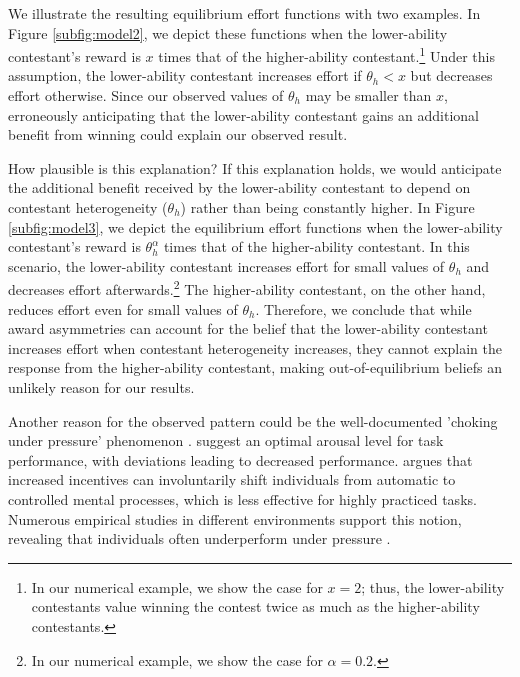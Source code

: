 \documentclass[11pt,a4paper]{article}
\begin{document}
We illustrate the resulting equilibrium effort functions with two examples. In Figure \ref{subfig:model2}, we depict these functions when the lower-ability contestant's reward is $x$ times that of the higher-ability contestant.\footnote{In our numerical example, we show the case for $x = 2$; thus, the lower-ability contestants value winning the contest twice as much as the higher-ability contestants.} Under this assumption, the lower-ability contestant increases effort if $\theta_h < x$ but decreases effort otherwise. Since our observed values of $\theta_h$ may be smaller than $x$, erroneously anticipating that the lower-ability contestant gains an additional benefit from winning could explain our observed result. \par

How plausible is this explanation? If this explanation holds, we would anticipate the additional benefit received by the lower-ability contestant to depend on contestant heterogeneity ($\theta_h$) rather than being constantly higher. In Figure \ref{subfig:model3}, we depict the equilibrium effort functions when the lower-ability contestant's reward is $\theta_h^\alpha$ times that of the higher-ability contestant. In this scenario, the lower-ability contestant increases effort for small values of $\theta_h$ and decreases effort afterwards.\footnote{In our numerical example, we show the case for $\alpha = 0.2$.} The higher-ability contestant, on the other hand, reduces effort even for small values of $\theta_h$. Therefore, we conclude that while award asymmetries can account for the belief that the lower-ability contestant increases effort when contestant heterogeneity increases, they cannot explain the response from the higher-ability contestant, making out-of-equilibrium beliefs an unlikely reason for our results.\par

Another reason for the observed pattern could be the well-documented 'choking under pressure' phenomenon \cite{Baumeister.1984, Ariely.2009}.  suggest an optimal arousal level for task performance, with deviations leading to decreased performance.  argues that increased incentives can involuntarily shift individuals from automatic to controlled mental processes, which is less effective for highly practiced tasks. Numerous empirical studies in different environments support this notion, revealing that individuals often underperform under pressure \cite{Dohmen.2008, Apesteguia.2010, Schlosser.2019}. \par
\end{document}
